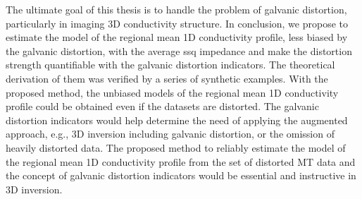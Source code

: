 	The ultimate goal of this thesis is to handle the problem of galvanic distortion, particularly in imaging 3D conductivity structure.
	In conclusion, we propose to estimate the model of the regional mean 1D conductivity profile, less biased by the galvanic distortion, with the average ssq impedance and make the distortion strength quantifiable with the galvanic distortion indicators. 
	The theoretical derivation of them was verified by a series of synthetic examples.
	With the proposed method, the unbiased models of the regional mean 1D conductivity profile could be obtained even if the datasets are distorted.
	The galvanic distortion indicators would help determine the need of applying the augmented approach, e.g., 3D inversion including galvanic distortion, or the omission of heavily distorted data.
	The proposed method to reliably estimate the model of the regional mean 1D conductivity profile from the set of distorted MT data and the concept of galvanic distortion indicators would be essential and instructive in 3D inversion.
		
